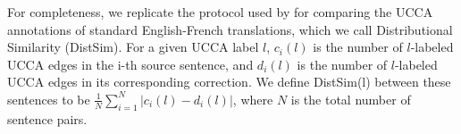 \documentclass[a4paper, 11pt]{article}
\begin{document}
For completeness, we replicate the protocol used by 
for comparing the UCCA annotations of standard English-French translations, which we call
Distributional Similarity ({\sc DistSim}).
For a given UCCA label $l$, $c_i(l)$ is the number of $l$-labeled UCCA edges
in the i-th source sentence, and $d_i(l)$ is the number of $l$-labeled UCCA edges
in its corresponding correction. We define {\sc DistSim}(l) between these
sentences to be $\frac{1}{N}\sum_{i=1}^N \vert c_i(l) - d_i(l) \vert$, where
$N$ is the total number of sentence pairs.

%
%
%
%
\end{document}
